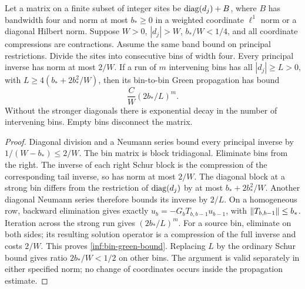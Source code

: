 \begin{lemma}\label{inf:bin-green}
Let a matrix on a finite subset of integer sites be
$\operatorname{diag}(d_j)+B$, where $B$ has bandwidth four and norm at
most $b_*\ge0$ in a weighted coordinate $\ell^1$ norm or a diagonal
Hilbert norm. Suppose $W>0$, $|d_j|>W$, $b_*/W<1/4$, and all coordinate
compressions are contractions. Assume the same band bound on
principal restrictions. Divide the sites into consecutive bins of
width four. Every principal inverse has norm at most $2/W$.
If a run of $m$ intervening bins has all $|d_j|\ge L>0$, with
$L\ge4(b_*+2b_*^2/W)$, then its bin-to-bin Green propagation has
bound
\begin{equation}\label{inf:bin-green-bound}
 \frac{C}{W}(2b_*/L)^m.
\end{equation}
Without the stronger diagonals there is exponential decay in the
number of intervening bins. Empty bins disconnect the matrix.
\end{lemma}
\begin{proof}
Diagonal division and a Neumann series bound every principal inverse
by $1/(W-b_*)\le2/W$. The bin matrix is block tridiagonal.
Eliminate bins from the right. The inverse of each right Schur
block is the compression of the corresponding tail inverse, so
has norm at most $2/W$. The diagonal block at a strong bin differs
from the restriction of $\operatorname{diag}(d_j)$ by at most $b_*+2b_*^2/W$.
Another diagonal Neumann series therefore bounds its inverse by
$2/L$. On a homogeneous row, backward elimination gives exactly
$u_b=-G_bT_{b,b-1}u_{b-1}$, with $\lVert T_{b,b-1}\rVert\le b_*$.
Iteration across the strong run gives $(2b_*/L)^m$.
For a source bin, eliminate on both sides; its resulting solution
operator is a compression of the full inverse and costs $2/W$.
This proves \eqref{inf:bin-green-bound}. Replacing $L$ by the
ordinary Schur bound gives ratio $2b_*/W<1/2$ on other bins.
The argument is valid separately in either specified norm; no
change of coordinates occurs inside the propagation estimate.
\end{proof}

